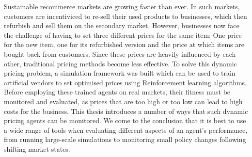 Sustainable recommerce markets are growing faster than ever. In such markets, customers are incentiviced to re-sell their used products to businesses, which then refurbish and sell them on the secondary market. However, businesses now face the challenge of having to set three different prices for the same item: One price for the new item, one for its refurbished version and the price at which items are bought back from customers. Since these prices are heavily influenced by each other, traditional pricing methods become less effective. To solve this dynamic pricing problem, a simulation framework was built which can be used to train artificial vendors to set optimised prices using Reinforcement learning algorithms.
Before employing these trained agents on real markets, their fitness must be monitored and evaluated, as prices that are too high or too low can lead to high costs for the business. This thesis introduces a number of ways that such dynamic pricing agents can be monitored. We come to the conclusion that it is best to use a wide range of tools when evaluating different aspects of an agent's performance, from running large-scale simulations to monitoring small policy changes following shifting market states.